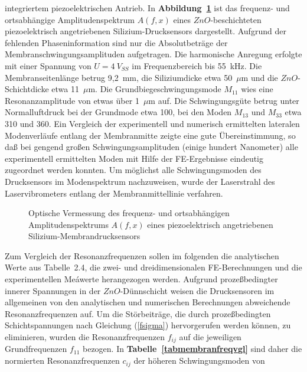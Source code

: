 integriertem piezoelektrischen Antrieb.
%
In {\bf Abbildung~\ref{abbspek}} ist das frequenz- und ortsabhängige
Amplitudenspektrum $A(f,x)$ eines $ZnO$-beschichteten piezoelektrisch
angetriebenen Silizium-Drucksensors dargestellt. Aufgrund der fehlenden
Phaseninformation sind nur die Absolutbeträge der
Membranschwingungsamplituden aufgetragen. Die harmonische Anregung
erfolgte mit einer Spannung von $U = 4~V_{SS}$ im Frequenzbereich bis
55~kHz. Die Membranseitenlänge betrug
9,2~mm, die Siliziumdicke etwa 50~$\mu$m und die $ZnO$-Schichtdicke etwa
11~$\mu$m.
Die Grundbiegeschwingungsmode $M_{11}$ wies eine Resonanzamplitude von
etwas über 1~$\mu$m auf. Die Schwingungsgüte betrug unter Normalluftdruck
bei der Grundmode etwa 100, bei den Moden $M_{13}$ und $M_{33}$ etwa
310 und 360. Ein Vergleich der experimentell und numerisch ermittelten
lateralen Modenverläufe entlang der Membranmitte zeigte eine gute
Übereinstimmung, so daß bei gengend großen Schwingungsamplituden
(einige hundert Nanometer) alle experimentell ermittelten Moden
mit Hilfe der FE-Ergebnisse eindeutig zugeordnet werden konnten.
Um möglichst alle Schwingungsmoden des Drucksensors im Modenspektrum
nachzuweisen, wurde der Laserstrahl des Laservibrometers entlang der
Membranmittellinie verfahren.
\begin{figure}[htb]
\begin{center}

\setabbvsex
\end{center}
\caption{\label{abbspek}
  Optische Vermessung des frequenz- und ortsabhängigen Amplitudenspektrums
  $A(f,x)$ eines piezoelektrisch angetriebenen Silizium-Membrandrucksensors}
\end{figure}
Zum Vergleich der Resonanzfrequenzen sollen im folgenden die analytischen
Werte aus Tabelle~2.4, %
die zwei- und dreidimensionalen FE-Berechnungen und
die experimentellen Meáwerte herangezogen werden. Aufgrund prozeßbedingter
innerer Spannungen in der $ZnO$-Dünnschicht weisen die Drucksensoren
im allgemeinen von den analytischen und numerischen Berechnungen
abweichende Resonanzfrequenzen auf. Um die Störbeiträge, die durch
prozeßbedingten Schichtspannungen nach Gleichung (\ref{fsigma})
hervorgerufen werden können, zu eliminieren, wurden die Resonanzfrequenzen
$f_{ij}$ auf die jeweiligen Grundfrequenzen $f_{11}$ bezogen. In
{\bf Tabelle~\ref{tabmembranfreqvgl}} sind daher die normierten
Resonanzfrequenzen $c_{ij}$ der höheren Schwingungsmoden von
